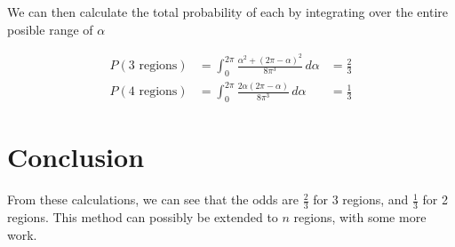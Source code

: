 \documentclass[twocolumn]{article}
\begin{document}
We can then calculate the total probability of each by integrating over the entire posible range of $\alpha$

\begin{align}
    P(3\text{ regions}) &= \int_0^{2\pi} \frac{\alpha^2 + (2\pi-\alpha)^2}
        {8\pi^3} \,d\alpha &= \frac{2}{3} \\
    P(4\text{ regions}) &= \int_0^{2\pi} \frac{2\alpha(2\pi-\alpha)}
        {8\pi^3} \,d\alpha &= \frac{1}{3}
\end{align}

\section{Conclusion}

From these calculations, we can see that the odds are $\frac{2}{3}$ for 3 regions, and $\frac{1}{3}$ for 2 regions.
This method can possibly be extended to $n$ regions, with some more work.
\end{document}
